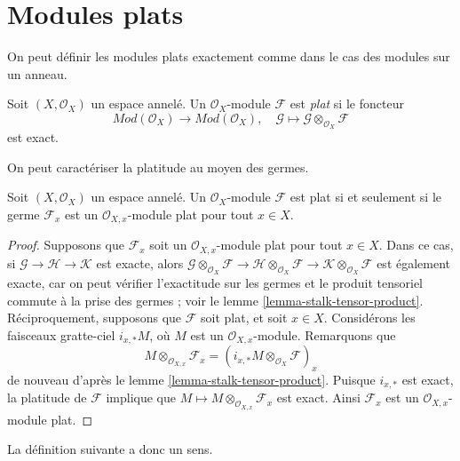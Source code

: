 \section{Modules plats}
\label{section-flat}

\noindent
On peut définir les modules plats exactement comme dans le cas des modules sur un anneau.

\begin{definition}
\label{definition-flat}
Soit $(X, \mathcal{O}_X)$ un espace annelé.
Un $\mathcal{O}_X$-module $\mathcal{F}$ est {\it plat} si le foncteur
$$
\textit{Mod}(\mathcal{O}_X)
\longrightarrow
\textit{Mod}(\mathcal{O}_X), \quad
\mathcal{G} \mapsto \mathcal{G} \otimes_{\mathcal{O}_X} \mathcal{F}
$$
est exact.
\end{definition}

\noindent
On peut caractériser la platitude au moyen des germes.

\begin{lemma}
\label{lemma-flat-stalks-flat}
Soit $(X, \mathcal{O}_X)$ un espace annelé.
Un $\mathcal{O}_X$-module $\mathcal{F}$ est plat
si et seulement si le germe $\mathcal{F}_x$ est un
$\mathcal{O}_{X, x}$-module plat pour tout $x \in X$.
\end{lemma}

\begin{proof}
Supposons que $\mathcal{F}_x$ soit un $\mathcal{O}_{X, x}$-module plat pour tout
$x \in X$. Dans ce cas, si $\mathcal{G} \to \mathcal{H} \to \mathcal{K}$
est exacte, alors
$\mathcal{G} \otimes_{\mathcal{O}_X} \mathcal{F} \to
\mathcal{H} \otimes_{\mathcal{O}_X} \mathcal{F} \to
\mathcal{K} \otimes_{\mathcal{O}_X} \mathcal{F}$
est également exacte, car on peut vérifier l'exactitude sur les germes et
le produit tensoriel commute à la prise des germes ; voir le
lemme \ref{lemma-stalk-tensor-product}.
Réciproquement, supposons que $\mathcal{F}$ soit plat, et soit $x \in X$.
Considérons les faisceaux gratte-ciel $i_{x, *} M$, où $M$ est un
$\mathcal{O}_{X, x}$-module. Remarquons que
$$
M \otimes_{\mathcal{O}_{X, x}} \mathcal{F}_x =
\left(i_{x, *} M \otimes_{\mathcal{O}_X} \mathcal{F}\right)_x
$$
de nouveau d'après le
lemme \ref{lemma-stalk-tensor-product}.
Puisque $i_{x, *}$ est exact, la platitude de $\mathcal{F}$ implique que
$M \mapsto M \otimes_{\mathcal{O}_{X, x}} \mathcal{F}_x$
est exact. Ainsi $\mathcal{F}_x$ est un $\mathcal{O}_{X, x}$-module plat.
\end{proof}

\noindent
La définition suivante a donc un sens.

